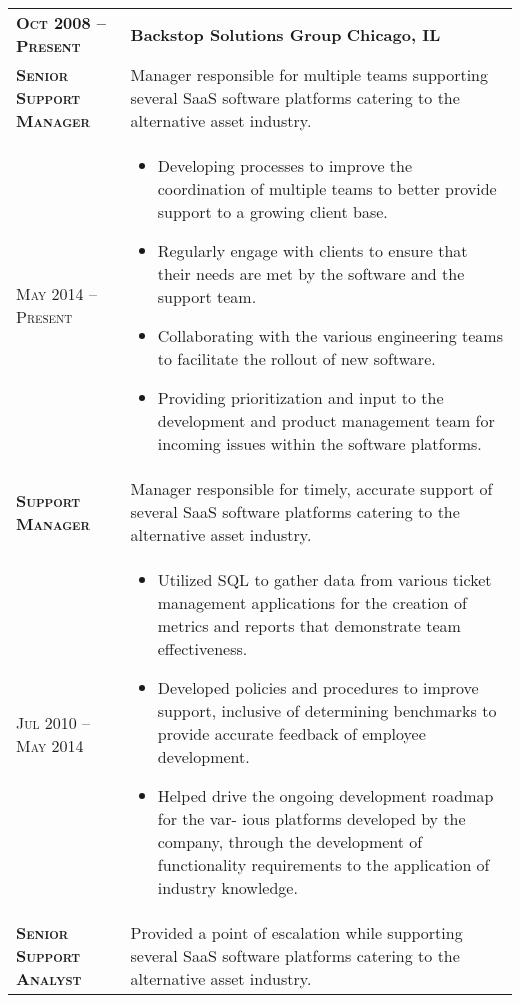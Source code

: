 \documentclass[a4paper, oneside, final]{scrartcl} %
\newcommand{\gray}{\rowcolor[gray]{.90}} %
\begin{document}
\begin{center}
\begin{tabularx}{0.97\linewidth}{>{\raggedright\scshape}p{3.4cm}X}
\gray \textbf{Oct 2008 -- Present} & \textbf{Backstop Solutions Group} \hfill \textbf{Chicago, IL}\\ 
\textbf{Senior Support Manager} & Manager responsible for multiple teams supporting several SaaS software platforms catering to the alternative asset industry.\\
May 2014 -- Present & \vspace{-6mm}
\begin{itemize}
\setlength{\itemsep}{0cm}%
\setlength{\parskip}{0cm}%
\item Developing processes to improve the coordination of multiple teams to better provide support to a growing client base.
\item Regularly engage with clients to ensure that their needs are met by the software and the support team. 
\item Collaborating with the various engineering teams to facilitate the rollout of new software.
\item Providing prioritization and input to the development and product management team for incoming issues within the software platforms.  
\end{itemize}\\
\textbf{Support Manager} & Manager responsible for timely, accurate support of several SaaS software platforms catering to the alternative asset industry.\\
Jul 2010 -- May 2014 & \vspace{-6mm}
\begin{itemize}
\setlength{\itemsep}{0cm}%
\setlength{\parskip}{0cm}%
\item Utilized SQL to gather data from various ticket management applications for the creation of metrics and reports that demonstrate team effectiveness.
\item Developed policies and procedures to improve support, inclusive of determining benchmarks to provide accurate feedback of employee development.
\item Helped drive the ongoing development roadmap for the var- ious platforms developed by the company, through the development of functionality requirements to the application of industry knowledge.
\end{itemize}\\
\textbf{Senior Support Analyst} & Provided a point of escalation while supporting several SaaS software platforms catering to the alternative asset industry.\\

\end{tabularx}
\end{center}
\end{document}

